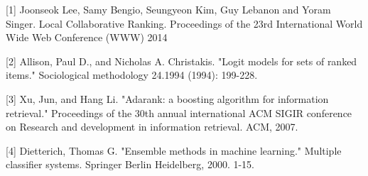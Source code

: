 \small{
[1] Joonseok Lee, Samy Bengio, Seungyeon Kim, Guy Lebanon and Yoram Singer. Local Collaborative Ranking. Proceedings of the 23rd International World Wide Web Conference (WWW) 2014

[2] Allison, Paul D., and Nicholas A. Christakis. "Logit models for sets of ranked items." Sociological methodology 24.1994 (1994): 199-228.

[3] Xu, Jun, and Hang Li. "Adarank: a boosting algorithm for information retrieval." Proceedings of the 30th annual international ACM SIGIR conference on Research and development in information retrieval. ACM, 2007.

[4] Dietterich, Thomas G. "Ensemble methods in machine learning." Multiple classifier systems. Springer Berlin Heidelberg, 2000. 1-15.
}
